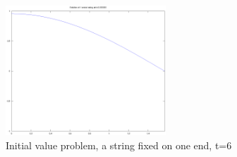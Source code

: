 \documentclass[a4paper,10pt]{report}
\begin{document}
\begin{figure}
 \includegraphics[width=6cm]{./one_fixed_end_analytic_t6.000000.eps}

\caption{Initial value problem, a string fixed on one end, t=6}
\label{fig:half_bounded_2}
\end{figure} 
\end{document}

